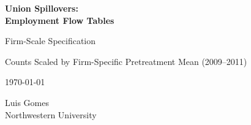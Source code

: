 \documentclass[12pt,letterpaper]{article}
\begin{document}
\begin{titlepage}
\centering
\vspace*{2cm}
{\Huge\bfseries Union Spillovers:\\Employment Flow Tables\par}
\vspace{2cm}
{\Large Firm-Scale Specification\par}
\vspace{0.5cm}
{\large Counts Scaled by Firm-Specific Pretreatment Mean (2009--2011)\par}
\vspace{1cm}
{\large \today\par}
\vfill
{\large Luis Gomes\\Northwestern University\par}
\end{titlepage}

\tableofcontents
\clearpage
\end{document}

